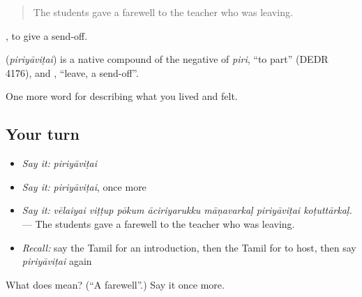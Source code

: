 \begin{quote}
The students gave a farewell to the teacher who was leaving.
\end{quote}

 , to give a send-off.

\begin{cousinweb}
\textbf{} (\emph{piriyāviṭai}) is a native compound of the negative of  \emph{piri}, \textquotedblleft{}to part\textquotedblright{} (DEDR 4176), and , \textquotedblleft{}leave, a send-off\textquotedblright{}.
\end{cousinweb}

\begin{grammarlens}[title={What you've built}]
One more word for describing what you lived and felt.
\end{grammarlens}

\subsection*{Your turn}
\begin{itemize}
\raggedright
  \item \emph{Say it:} \emph{piriyāviṭai}
  \item \emph{Say it:} \emph{piriyāviṭai}, once more
  \item \emph{Say it:} \emph{vēlaiyai viṭṭup pōkum āciriyarukku māṇavarkaḷ piriyāviṭai koṭuttārkaḷ.} — The students gave a farewell to the teacher who was leaving.
  \item \emph{Recall:} say the Tamil for an introduction, then the Tamil for to host, then say \emph{piriyāviṭai} again
\end{itemize}

\begin{tcolorbox}[breakable,colback=teal!4,colframe=teal!35!black,title={Before you move on}]
What does  mean? (\textquotedblleft{}A farewell\textquotedblright{}.) Say it once more.
\end{tcolorbox}
